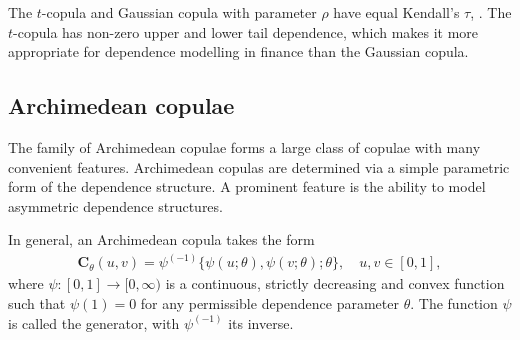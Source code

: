 The $t$-copula and Gaussian copula with parameter $\rho$ have equal Kendall's $\tau$, \citep[see][and references therein]{demarta2005t}.
The $t$-copula has non-zero upper and lower tail dependence, which makes it more appropriate for dependence modelling in finance than the Gaussian copula.

\subsection{Archimedean copulae}\label{sec:archimedean-copula}
The family of Archimedean copulae forms a large class of copulae with
many convenient features.
Archimedean copulas are determined via a simple parametric form of the
dependence structure. A prominent feature is the ability to model
asymmetric dependence structures.  

In general, an Archimedean copula takes the form
\begin{align*}
  \bm{C}_\theta(u,v) = \psi^{(-1)}\{\psi(u; \theta), \psi(v; \theta); \theta\},\quad u,v\in [0,1],
    \end{align*}
where $\psi:[0,1] \rightarrow [0,\infty)$ is a continuous, strictly
decreasing and convex function such that $\psi(1)=0$ for any
permissible dependence parameter $\theta$. The function $\psi$ is 
called the generator, with $\psi^{(-1)}$ its inverse.

